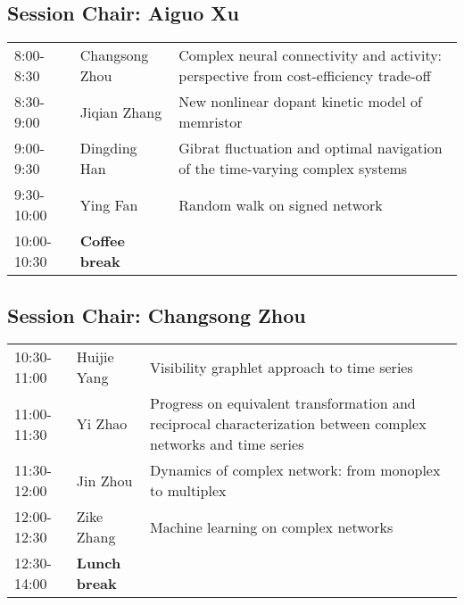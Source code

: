 \documentclass[oneside,A4paper,12pt]{article}
\begin{document}
\subsection*{Session \uppercase\expandafter{}  \hspace{10mm} Chair: Aiguo Xu}
\label{sec:orgc1a1496}

\begin{center}
\begin{tabular}{p{2.5cm}p{4cm}p{8.5cm}}
\toprule
8:00-8:30 & Changsong Zhou & Complex neural connectivity and activity: perspective from cost-efficiency trade-off\\
8:30-9:00 & Jiqian Zhang & New nonlinear dopant kinetic model of memristor\\
9:00-9:30 & Dingding Han & Gibrat fluctuation and optimal navigation of the time-varying complex systems\\
9:30-10:00 & Ying Fan & Random walk on signed network\\
\cellcolor{blue!25}10:00-10:30 & \cellcolor{blue!25}\textbf{Coffee break} & \cellcolor{blue!25}\\
\bottomrule
\end{tabular}
\end{center}


\subsection*{Session \uppercase\expandafter{}  \hspace{10mm} Chair: Changsong Zhou}
\label{sec:orgafcad76}


\begin{center}
\begin{tabular}{p{2.5cm}p{4cm}p{8.5cm}}
\toprule
10:30-11:00 & Huijie Yang & Visibility graphlet approach to time series\\
11:00-11:30 & Yi Zhao & Progress on equivalent transformation and reciprocal characterization between complex networks and time series\\
11:30-12:00 & Jin Zhou & Dynamics of complex network: from monoplex to multiplex\\
12:00-12:30 & Zike Zhang & Machine learning on complex networks\\
\cellcolor{blue!25}12:30-14:00 & \cellcolor{blue!25}\textbf{Lunch break} & \cellcolor{blue!25}\\
\bottomrule
\end{tabular}
\end{center}
\end{document}
